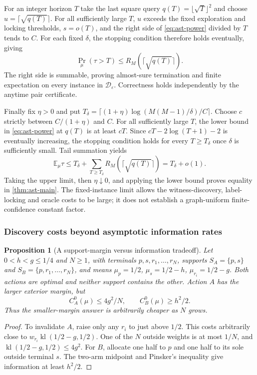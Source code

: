 \documentclass{article}
\theoremstyle{plain}
\newtheorem{proposition}[theorem]{Proposition}
\theoremstyle{definition}
\begin{document}
For an integer horizon $T$ take the last square query
$q(T)=\lfloor\sqrt T\rfloor^2$ and choose
$u=\lceil\sqrt{q(T)}\rceil$.  For all sufficiently large $T$, $u$ exceeds
the fixed exploration and locking thresholds, $s=o(T)$, and the right side
of \eqref{eq:ast-power} divided by $T$ tends to $C$.  For each fixed
$\delta$, the stopping condition therefore holds eventually, giving
\[
 \Pr_\mu(\tau>T)\le R_M(\lceil\sqrt{q(T)}\rceil).
\]
The right side is summable, proving almost-sure termination and finite
expectation on every instance in $\mathcal D_\varepsilon$.  Correctness
holds independently by the anytime pair certificate.

Finally fix $\eta>0$ and put
$T_\delta=\lceil(1+\eta)\log(M(M-1)/\delta)/C\rceil$.
Choose $c$ strictly between $C/(1+\eta)$ and $C$.
For all sufficiently large $T$, the lower bound in
\eqref{eq:ast-power} at $q(T)$ is at least $cT$.
Since $cT-2\log(T+1)-2$ is eventually increasing, the stopping condition
holds for every $T\ge T_\delta$ once $\delta$ is sufficiently small.
Tail summation yields
\[
 \mathbb E_\mu\tau\le T_\delta+
   \sum_{T\ge T_\delta}R_M(\lceil\sqrt{q(T)}\rceil)
 =T_\delta+o(1).
\]
Taking the upper limit, then $\eta\downarrow0$, and applying the lower
bound proves equality in \cref{thm:ast-main}.  The fixed-instance limit
allows the witness-discovery, label-locking and oracle costs to be large;
it does not establish a graph-uniform finite-confidence constant factor.

\subsubsection{Discovery costs beyond asymptotic information rates}
\begin{proposition}[A support-margin versus information tradeoff]
\label{prop:ast-gap-tradeoff}
Let $0<h<g\le1/4$ and $N\ge1$, with terminals $p,s,r_1,\ldots,r_N$, supports
$S_A=\{p,s\}$ and $S_B=\{p,r_1,\ldots,r_N\}$, and means
$\mu_p=1/2$, $\mu_s=1/2-h$, $\mu_{r_i}=1/2-g$.
Both actions are optimal and neither support contains the other.
Action $A$ has the larger exterior margin, but
\[
 C_A^0(\mu)\le4g^2/N,\qquad C_B^0(\mu)\ge h^2/2.
\]
Thus the smaller-margin answer is arbitrarily cheaper as $N$ grows.
\end{proposition}
\begin{proof}
To invalidate $A$, raise only any $r_i$ to just above $1/2$.  This costs
arbitrarily close to $w_{r_i}\operatorname{kl}(1/2-g,1/2)$.
One of the $N$ outside weights is at most $1/N$, and
$\operatorname{kl}(1/2-g,1/2)\le4g^2$.
For $B$, allocate one half to $p$ and one half to its sole outside terminal
$s$.  The two-arm midpoint and Pinsker's inequality give information at
least $h^2/2$.
\end{proof}
\end{document}
